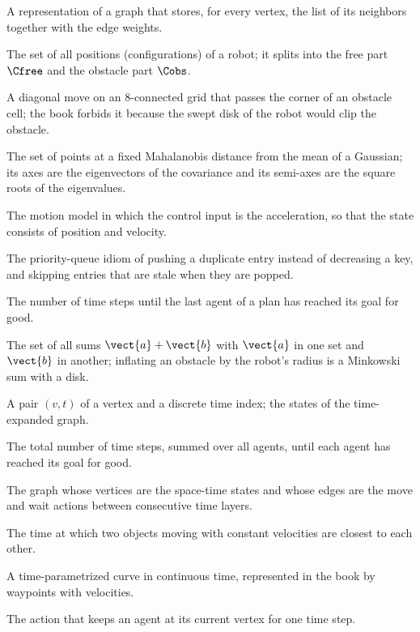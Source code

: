 \item[Adjacency list] A representation of a graph that stores, for every vertex, the list of its neighbors together with the edge weights.
\item[Configuration space] The set of all positions (configurations) of a robot; it splits into the free part $\Cfree$ and the obstacle part $\Cobs$.
\item[Corner cutting] A diagonal move on an 8-connected grid that passes the corner of an obstacle cell; the book forbids it because the swept disk of the robot would clip the obstacle.
\item[Covariance ellipse] The set of points at a fixed Mahalanobis distance from the mean of a Gaussian; its axes are the eigenvectors of the covariance and its semi-axes are the square roots of the eigenvalues.
\item[Double integrator] The motion model in which the control input is the acceleration, so that the state consists of position and velocity.
\item[Lazy deletion] The priority-queue idiom of pushing a duplicate entry instead of decreasing a key, and skipping entries that are stale when they are popped.
\item[Makespan] The number of time steps until the last agent of a plan has reached its goal for good.
\item[Minkowski sum] The set of all sums $\vect{a}+\vect{b}$ with $\vect{a}$ in one set and $\vect{b}$ in another; inflating an obstacle by the robot's radius is a Minkowski sum with a disk.
\item[Space-time state] A pair $(v,t)$ of a vertex and a discrete time index; the states of the time-expanded graph.
\item[Sum of costs] The total number of time steps, summed over all agents, until each agent has reached its goal for good.
\item[Time-expanded graph] The graph whose vertices are the space-time states and whose edges are the move and wait actions between consecutive time layers.
\item[Time of closest approach] The time at which two objects moving with constant velocities are closest to each other.
\item[Trajectory] A time-parametrized curve in continuous time, represented in the book by waypoints with velocities.
\item[Wait action] The action that keeps an agent at its current vertex for one time step.
